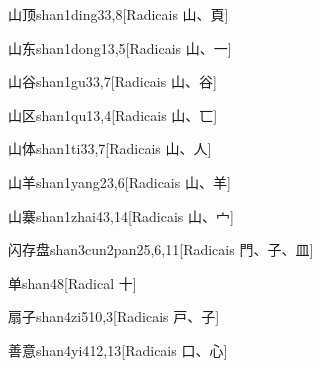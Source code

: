 \begin{entry}{山顶}{shan1ding3}{3,8}[Radicais ⼭、⾴]
\end{entry}

\begin{entry}{山东}{shan1dong1}{3,5}[Radicais ⼭、⼀]
\end{entry}

\begin{entry}{山谷}{shan1gu3}{3,7}[Radicais ⼭、⾕]
\end{entry}

\begin{entry}{山区}{shan1qu1}{3,4}[Radicais ⼭、⼖]
\end{entry}

\begin{entry}{山体}{shan1ti3}{3,7}[Radicais ⼭、⼈]
\end{entry}

\begin{entry}{山羊}{shan1yang2}{3,6}[Radicais ⼭、⽺]
\end{entry}

\begin{entry}{山寨}{shan1zhai4}{3,14}[Radicais ⼭、⼧]
\end{entry}

\begin{entry}{闪存盘}{shan3cun2pan2}{5,6,11}[Radicais ⾨、⼦、⽫]
\end{entry}

\begin{entry}{单}{shan4}{8}[Radical ⼗]
\end{entry}

\begin{entry}{扇子}{shan4zi5}{10,3}[Radicais ⼾、⼦]
\end{entry}

\begin{entry}{善意}{shan4yi4}{12,13}[Radicais ⼝、⼼]
\end{entry}

